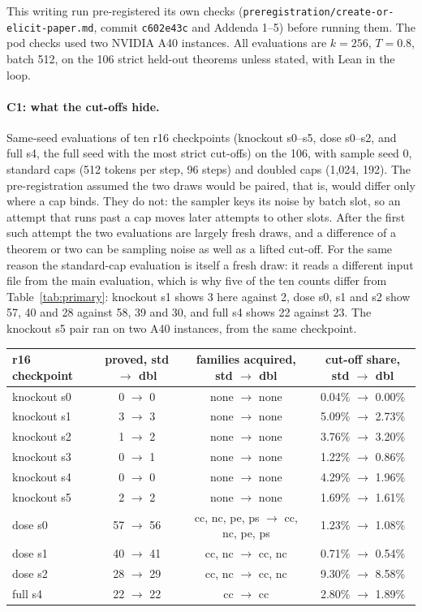 This writing run pre-registered its own checks (\texttt{preregistration/create-or-elicit-paper.md}, commit
\texttt{c602e43c} and Addenda 1--5) before running them. The pod checks used two NVIDIA A40 instances. All evaluations
are $k=256$, $T=0.8$, batch 512, on the 106 strict held-out theorems unless stated, with Lean in the loop.

\paragraph{C1: what the cut-offs hide.} Same-seed evaluations of ten r16 checkpoints (knockout s0--s5, dose s0--s2, and full s4,
the full seed with the most strict cut-offs) on the 106, with sample seed 0, standard caps (512 tokens per step, 96 steps) and doubled caps (1,024, 192). The pre-registration
assumed the two draws would be paired, that is, would differ only where a cap binds. They do not: the sampler keys its noise by batch slot, so
an attempt that runs past a cap moves later attempts to other slots. After the first such
attempt the two evaluations are largely fresh draws, and a difference of a theorem or two can be sampling noise as well
as a lifted cut-off. For the same reason the standard-cap evaluation is itself a fresh draw: it reads a different input
file from the main evaluation, which is why five of the ten counts differ from Table~\ref{tab:primary}: knockout s1
shows 3 here against 2, dose s0, s1 and s2 show 57, 40 and 28 against 58, 39 and 30, and full s4 shows 22 against 23. The knockout s5 pair ran on two A40 instances, from the same checkpoint.
\begin{center}\footnotesize
\begin{tabular}{lccc}
\toprule
r16 checkpoint & proved, std $\to$ dbl & families acquired, std $\to$ dbl & cut-off share, std $\to$ dbl \\
\midrule
knockout s0 & 0 $\to$ 0 & none $\to$ none & 0.04\% $\to$ 0.00\% \\
knockout s1 & 3 $\to$ 3 & none $\to$ none & 5.09\% $\to$ 2.73\% \\
knockout s2 & 1 $\to$ 2 & none $\to$ none & 3.76\% $\to$ 3.20\% \\
knockout s3 & 0 $\to$ 1 & none $\to$ none & 1.22\% $\to$ 0.86\% \\
knockout s4 & 0 $\to$ 0 & none $\to$ none & 4.29\% $\to$ 1.96\% \\
knockout s5 & 2 $\to$ 2 & none $\to$ none & 1.69\% $\to$ 1.61\% \\
dose s0 & 57 $\to$ 56 & cc, nc, pe, ps $\to$ cc, nc, pe, ps & 1.23\% $\to$ 1.08\% \\
dose s1 & 40 $\to$ 41 & cc, nc $\to$ cc, nc & 0.71\% $\to$ 0.54\% \\
dose s2 & 28 $\to$ 29 & cc, nc $\to$ cc, nc & 9.30\% $\to$ 8.58\% \\
full s4 & 22 $\to$ 22 & cc $\to$ cc & 2.80\% $\to$ 1.89\% \\
\bottomrule
\end{tabular}
\end{center}
